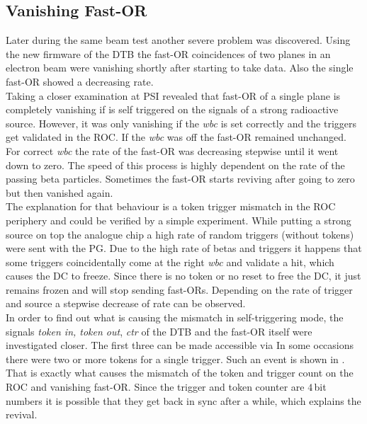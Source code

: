 \subsection{Vanishing Fast-OR}
Later during the same beam test another severe problem was discovered. Using the new firmware of the \ac{DTB} the fast-OR coincidences of two planes in an electron beam were vanishing shortly after starting to take data. Also the single fast-OR showed a decreasing rate.\\
Taking a closer examination at PSI revealed that fast-OR of a single plane is completely vanishing if is self triggered on the signals of a strong radioactive  source. However, it was only vanishing if the \textit{wbc} is set correctly and the triggers get validated in the \ac{ROC}. If the \textit{wbc} was off the fast-OR remained unchanged. For correct \textit{wbc} the rate of the fast-OR was decreasing stepwise until it went down to zero. The speed of this process is highly dependent on the rate of the passing beta particles. Sometimes the fast-OR starts reviving after going to zero but then vanished again.\\
The explanation for that behaviour is a token trigger mismatch in the \ac{ROC} periphery and could be verified by a simple experiment. While putting a strong source on top the analogue chip a high rate of random triggers (without tokens) were sent with the \ac{PG}. Due to the high rate of betas and triggers it happens that some triggers coincidentally come at the right \textit{wbc} and validate a hit, which causes the \ac{DC} to freeze. Since there is no token or no reset to free the \ac{DC}, it just remains frozen and will stop sending fast-ORs. Depending on the rate of trigger and source a stepwise decrease of rate can be observed.\\
In order to find out what is causing the mismatch in self-triggering mode, the signals \textit{token in, token out}, \textit{ctr} of the \ac{DTB} and the fast-OR itself were investigated closer. The first three can be made accessible via
In some occasions there were two or more tokens for a single trigger. Such an event is shown in . That is exactly what causes the mismatch of the token and trigger count on the \ac{ROC} and vanishing fast-OR. Since the trigger and token counter are $4\,$bit numbers it is possible that they get back in sync after a while, which explains the revival.\\
